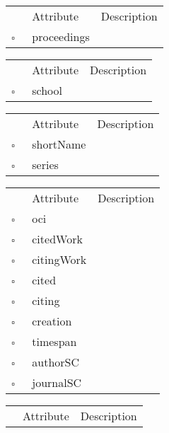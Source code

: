 \begin{table}
\caption{Paper  }

\begin{longtable}{llp{8cm}}
& Attribute & Description \\
$\square$\ & proceedings &  \\
\end{longtable}
\label{attr:Paper}
\end{table}

\begin{table}
\caption{PhDThesis  }

\begin{longtable}{llp{8cm}}
& Attribute & Description \\
$\square$\ & school &  \\
\end{longtable}
\label{attr:PhDThesis}
\end{table}

\begin{table}
\caption{Proceedings  }

\begin{longtable}{llp{8cm}}
& Attribute & Description \\
$\square$\ & shortName &  \\
$\square$\ & series &  \\
\end{longtable}
\label{attr:Proceedings}
\end{table}

\clearpage
\begin{table}
\caption{Reference  }

\begin{longtable}{llp{8cm}}
& Attribute & Description \\
$\square$\ & oci &  \\
$\square$\ & citedWork &  \\
$\square$\ & citingWork &  \\
$\square$\ & cited &  \\
$\square$\ & citing &  \\
$\square$\ & creation &  \\
$\square$\ & timespan &  \\
$\square$\ & authorSC &  \\
$\square$\ & journalSC &  \\
\end{longtable}
\label{attr:Reference}
\end{table}

\begin{table}
\caption{Scenario  This class describes the dataset for the application. Typically there is a single instance of this class in the application at all times.}

\begin{longtable}{llp{8cm}}
& Attribute & Description \\
\end{longtable}
\label{attr:Scenario}
\end{table}

